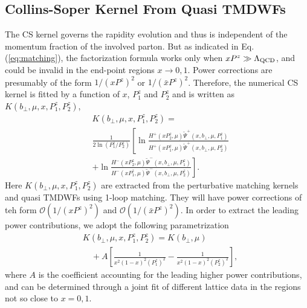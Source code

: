 \documentclass[prd,aps,twocolumn,preprintnumbers, showpacs, nofootinbib,superscriptaddress,notitlepage]{revtex4-1}
\begin{document}
\subsection{Collins-Soper Kernel From Quasi TMDWFs}
\label{subsec:csresults}

The CS kernel governs the rapidity evolution and thus is independent of the momentum fraction of the involved parton.  But as indicated in Eq.(\ref{eq:matching}), the factorization formula  works only when $xP^z\gg \Lambda_{\rm QCD}$, and could be invalid  in the end-point regions $x\to0,1$. Power corrections are presumably  of the form $1/\left(xP^z\right)^2$ or $1/\left(\bar{x}P^z\right)^2$. Therefore,  the numerical CS kernel is fitted by a function of $x$, $P_1^z$ and $P_2^z$ and is written as $K(b_{\perp},\mu,x,P^z_1,P^z_2)$,
\begin{align}
&K(b_{\perp},\mu,x,P^z_1,P^z_2) =\nonumber\\
&\frac{1}{2\ln(P_1^z/P_2^z)} \left[\ln\frac{H^{+}(xP_2^z,\mu)\tilde{\Psi}^{+}(x,b_{\perp},\mu,P_1^z)}{H^{+}(xP_1^z,\mu)\tilde{\Psi}^{+}(x,b_{\perp},\mu,P_2^z)}\right.  \nonumber\\
	&+\left.\ln\frac{H^{-}(xP_2^z,\mu)\tilde{\Psi}^{-}(x,b_{\perp},\mu,P_1^z)}{H^{-}(xP_1^z,\mu)\tilde{\Psi}^{-}(x,b_{\perp},\mu,P_2^z)}\right].
\end{align}
Here $K(b_{\perp},\mu,x,P^z_1,P^z_2)$ are extracted from the perturbative matching kernels and quasi TMDWFs using 1-loop matching. They will have power corrections of teh form $\mathcal{O}\left(1/\left(xP^z\right)^2\right)$ and $\mathcal{O}\left(1/\left(\bar{x}P^z\right)^2\right)$. In order to extract the leading power contributions, we adopt  the following parametrization
\begin{align}
&K(b_{\perp},\mu,x,P^z_1,P^z_2) = K(b_{\perp},\mu) \nonumber\\
&\quad+A\left[\frac{1}{x^2(1-x)^2(P^z_1)^2}-\frac{1}{x^2(1-x)^2(P^z_2)^2}\right], \label{eq:parametrizationofCSkernel}
\end{align}
where $A$ is the coefficient accounting for  the leading higher power contributions, and can be determined through a joint fit of different lattice data in the regions not so close to $x=0, 1$. 
\end{document}
